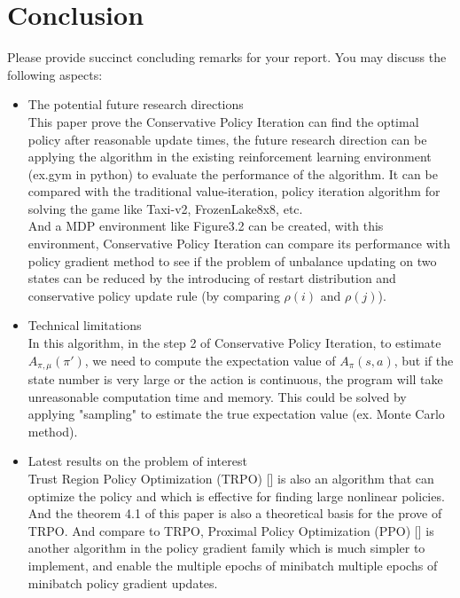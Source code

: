 \section{Conclusion}
\label{section:conclusion}
Please provide succinct concluding remarks for your report. You may discuss the following aspects:
\begin{itemize}
    \item The potential future research directions \\
    This paper prove the Conservative Policy Iteration can find the optimal policy after reasonable update times, the future research direction can be applying the algorithm in the existing reinforcement learning environment (ex.gym in python) to evaluate the performance of the algorithm. It can be compared with the traditional value-iteration, policy iteration algorithm for solving the game like Taxi-v2, FrozenLake8x8, etc. \\
    And a MDP environment like Figure3.2 can be created, with this environment, Conservative Policy Iteration
    can compare its performance with policy gradient method to see if the problem of unbalance updating on two states can be reduced by the introducing of restart distribution and conservative policy update rule (by comparing $\rho(i)$ and $\rho(j)$). \\
    \item Technical limitations \\
    In this algorithm, in the step 2 of Conservative Policy Iteration, to estimate $A_{\pi, \mu}(\pi')$, we 
    need to compute the expectation value of $A_{\pi}(s,a)$, but if the state number is very large or the action is continuous, the program will take unreasonable computation time and memory. This could be solved by applying "sampling" to estimate the true expectation value (ex. Monte Carlo method). \\
    \item Latest results on the problem of interest \\
    Trust Region Policy Optimization (TRPO) [\cite{DBLP:journals/corr/SchulmanLMJA15}] is also an algorithm that can optimize the policy and which is effective for finding large nonlinear policies. And the theorem 4.1 of this paper is also a theoretical basis for the prove of TRPO. 
    And compare to TRPO, Proximal Policy Optimization (PPO) 
    [\cite{DBLP:journals/corr/SchulmanWDRK17}] is another algorithm in
    the policy gradient family which is much simpler to implement, and enable the
    multiple epochs of minibatch multiple epochs of minibatch policy gradient updates.
    
    
\end{itemize}